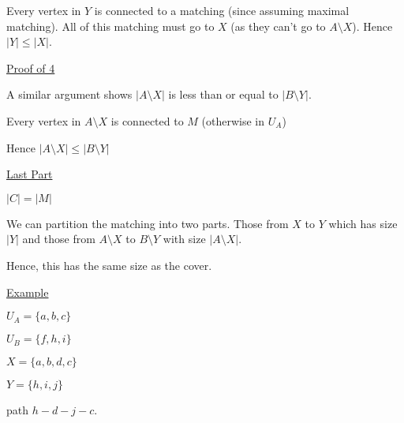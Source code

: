 \documentclass{article}
\begin{document}
Every vertex in $Y$ is connected to a matching (since assuming maximal matching). All of this matching must go to $X$ (as they can't go to $A \setminus X$). Hence $|Y| \le |X|$. 

\underline{Proof of 4}

A similar argument shows $|A \setminus X|$ is less than or equal to $|B \setminus Y|$. 

Every vertex in $A \setminus X$ is connected to $M$ (otherwise in $U_A$)

Hence $|A \setminus X| \le |B \setminus Y|$

\underline{Last Part}

$|C| = |M|$

We can partition the matching into two parts. Those from $X$ to $Y$ which has size $|Y|$ and those from $A \setminus X$ to $B \setminus Y$ with size $|A \setminus X|$. 

Hence, this has the same size as the cover. 

\underline{Example}

\begin{center}
\end{center}

$U_A = \{a,b,c\}$

$U_B = \{f,h,i\}$

$X = \{a,b,d,c\}$

$Y = \{h,i,j\}$

path $h - d - j - c$.
\end{document}
